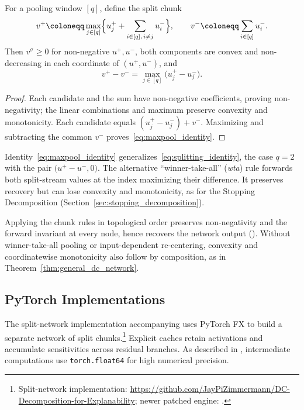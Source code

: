 \begin{proposition}\label{prop:maxpool_correct}
For a pooling window $[q]$, define the split chunk
\begin{equation}
	v^+ \coloneqq \max_{j \in [q]} \Bigl\{ u_j^+ + \sum_{i \in [q],\, i \neq j} u_i^- \Bigr\},
	\qquad
	v^- \coloneqq \sum_{i \in [q]} u_i^-.
	\label{eq:maxpool_split}
\end{equation}
Then $v^\sigma \ge 0$ for non-negative $u^+,u^-$, both components are convex and non-decreasing in each coordinate of $(u^+, u^-)$, and
\begin{equation}
	v^+ - v^- = \max_{j \in [q]} \bigl( u_j^+ - u_j^- \bigr).
	\label{eq:maxpool_identity}
\end{equation}\end{proposition}

\begin{proof}
Each candidate and the sum have non-negative coefficients, proving non-negativity; the linear combinations and maximum preserve convexity and monotonicity. Each candidate equals $(u_j^+-u_j^-)+v^-$. Maximizing and subtracting the common $v^-$ proves~\eqref{eq:maxpool_identity}.
\end{proof}

Identity~\eqref{eq:maxpool_identity} generalizes~\eqref{eq:splitting_identity}, the case $q = 2$ with the pair $\bigl( u^+ - u^-, 0 \bigr)$. The alternative ``winner-take-all'' (\emph{wta}) rule forwards both split-stream values at the index maximizing their difference. It preserves recovery but can lose convexity and monotonicity, as for the Stopping Decomposition (Section~\ref{sec:stopping_decomposition}).

Applying the chunk rules in topological order preserves non-negativity and the forward invariant at every node, hence recovers the network output (). Without winner-take-all pooling or input-dependent re-centering, convexity and coordinatewise monotonicity also follow by composition, as in Theorem~\ref{thm:general_dc_network}.

\subsection{PyTorch Implementations}\label{subsec:split_implementations}

The split-network implementation accompanying \textcite{hiddenMono} uses PyTorch FX to build a separate network of split chunks.\footnote{Split-network implementation: \url{https://github.com/JayPiZimmermann/DC-Decomposition-for-Explanability}; newer patched engine: \coderepo.} Explicit caches retain activations and accumulate sensitivities across residual branches. As described in \textcite{hiddenMono}, intermediate computations use \texttt{torch.float64} for high numerical precision.

